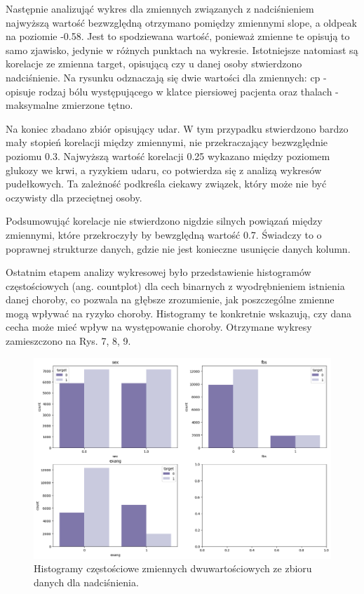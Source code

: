 \documentclass[onecolumn,12pt]{article}
\begin{document}
\vspace{8pt}
\noindent
Następnie analizująć wykres dla zmiennych związanych z nadciśnieniem najwyższą wartość bezwzględną otrzymano pomiędzy zmiennymi slope, a oldpeak na poziomie -0.58. Jest to spodziewana wartość, ponieważ zmienne te opisują to samo zjawisko, jedynie w różnych punktach na wykresie. Istotniejsze natomiast są korelacje ze zmienna target, opisującą czy u danej osoby stwierdzono nadciśnienie. Na rysunku odznaczają się dwie wartości dla zmiennych: cp - opisuje rodzaj bólu występującego w klatce piersiowej pacjenta oraz thalach - maksymalne zmierzone tętno. 

\vspace{8pt}
\noindent
Na koniec zbadano zbiór opisujący udar. W tym przypadku stwierdzono bardzo mały stopień korelacji między zmiennymi, nie przekraczający bezwzględnie poziomu 0.3. Najwyższą wartość  korelacji 0.25 wykazano między poziomem glukozy we krwi, a ryzykiem udaru, co potwierdza się z analizą wykresów pudełkowych. Ta zależność podkreśla ciekawy związek, który może nie być oczywisty dla przeciętnej osoby. 

\vspace{8pt}
\noindent
Podsumowująć korelacje nie stwierdzono nigdzie silnych powiązań między zmiennymi, które przekroczyły by bewzględną wartość 0.7. Świadczy to o poprawnej strukturze danych, gdzie nie jest konieczne usunięcie danych kolumn.

\vspace{8pt}
\noindent
Ostatnim etapem analizy wykresowej było przedstawienie histogramów częstościowych (ang. countplot) dla cech binarnych z wyodrębnieniem istnienia danej choroby, co pozwala na głębsze zrozumienie, jak poszczególne zmienne mogą wpływać na ryzyko choroby. Histogramy te konkretnie wskazują, czy dana cecha może mieć wpływ na występowanie choroby. Otrzymane wykresy zamieszczono na Rys. 7, 8, 9.


\begin{figure}[H]
    \centering
    \includegraphics[width=0.85\linewidth]{raport/graphs/hypertension_binary.png}
    \captionsetup{justification=centering}
    \caption{Histogramy częstościowe zmiennych dwuwartościowych ze zbioru danych dla nadciśnienia.}
    \label{fig:enter-label}
\end{figure}
\end{document}
